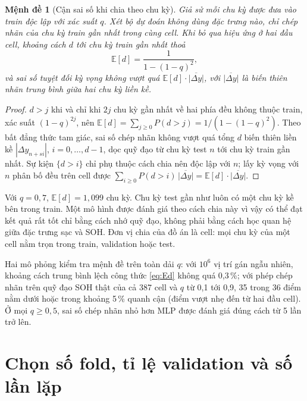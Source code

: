 \documentclass[12pt,a4paper,oneside]{report}
\theoremstyle{plain}
\newtheorem{menhde}{Mệnh đề}[chapter]
\theoremstyle{definition}
\newcommand{\E}{\mathbb{E}}
\begin{document}
\begin{menhde}[Cận sai số khi chia theo chu kỳ]\label{md:rowleak}
Giả sử mỗi chu kỳ được đưa vào train độc lập với xác suất $q$. Xét bộ dự đoán không dùng đặc trưng nào, chỉ
chép nhãn của chu kỳ train gần nhất trong cùng cell. Khi bỏ qua hiệu ứng ở hai đầu cell, khoảng cách $d$ tới
chu kỳ train gần nhất thoả
\begin{equation}
\E[d] = \frac{1}{1 - (1-q)^2},\label{eq:Ed}
\end{equation}
và sai số tuyệt đối kỳ vọng không vượt quá $\E[d]\cdot\overline{|\Delta y|}$, với $\overline{|\Delta y|}$ là biến
thiên nhãn trung bình giữa hai chu kỳ liền kề.
\end{menhde}
\begin{proof}
$d > j$ khi và chỉ khi $2j$ chu kỳ gần nhất về hai phía đều không thuộc train, xác suất $(1-q)^{2j}$, nên
$\E[d] = \sum_{j \ge 0} P(d > j) = 1/(1-(1-q)^2)$. Theo bất đẳng thức tam giác, sai số chép nhãn không vượt quá tổng
$d$ biến thiên liền kề $|\Delta y_{n+si}|$, $i = 0, \dots, d-1$, dọc quỹ đạo từ chu kỳ test $n$ tới chu kỳ train gần
nhất. Sự kiện $\{d > i\}$ chỉ phụ thuộc cách chia nên độc lập với $n$; lấy kỳ vọng với $n$ phân bố đều trên cell được
$\sum_{i \ge 0} P(d > i)\,\overline{|\Delta y|} = \E[d]\cdot\overline{|\Delta y|}$.
\end{proof}

Với $q = 0{,}7$, $\E[d] = 1{,}099$ chu kỳ. Chu kỳ test gần như luôn có một chu kỳ kề bên trong train. Một mô hình được
đánh giá theo cách chia này vì vậy có thể đạt kết quả rất tốt chỉ bằng cách nhớ quỹ đạo, không phải bằng cách
học quan hệ giữa đặc trưng sạc và SOH. Đơn vị chia của đồ án là cell: mọi chu kỳ của một cell nằm trọn trong
train, validation hoặc test.



Hai mô phỏng kiểm tra mệnh đề trên toàn dải $q$: với $10^6$ vị trí gán ngẫu nhiên, khoảng cách trung bình lệch công
thức \eqref{eq:Ed} không quá 0{,}3\,\%; với phép chép nhãn trên quỹ đạo SOH thật của cả 387 cell và $q$ từ 0,1 tới
0,9, 35 trong 36 điểm nằm dưới hoặc trong khoảng 5\,\% quanh cận (điểm vượt nhẹ đến từ hai đầu cell). Ở mọi
$q \ge 0{,}5$, sai số chép nhãn nhỏ hơn MLP được đánh giá đúng cách từ 5 lần trở lên.



\section{Chọn số fold, tỉ lệ validation và số lần lặp}
\end{document}
